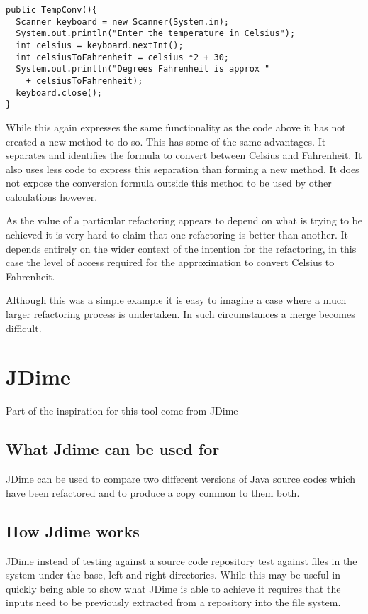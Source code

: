 \begin{lstlisting}
public TempConv(){
  Scanner keyboard = new Scanner(System.in);
  System.out.println("Enter the temperature in Celsius");
  int celsius = keyboard.nextInt();
  int celsiusToFahrenheit = celsius *2 + 30;
  System.out.println("Degrees Fahrenheit is approx " 
    + celsiusToFahrenheit);
  keyboard.close();
}
\end{lstlisting}

While this again expresses the same functionality as the code above it has not created a new method to do so. This has some of the same advantages. It separates and identifies the formula to convert between Celsius and Fahrenheit. It also uses less code to express this separation than forming a new method. It does not expose the conversion formula outside this method to be used by other calculations however.

As the value of a particular refactoring appears to depend on what is trying to be achieved it is very hard to claim that one refactoring is better than another. It depends entirely on the wider context of the intention for the refactoring, in this case the level of access required for the approximation to convert Celsius to Fahrenheit.

Although this was a simple example it is easy to imagine a case where a much larger refactoring process is undertaken. In such circumstances a merge becomes difficult. 

\section{JDime}
Part of the inspiration for this tool come from JDime

\subsection{What Jdime can be used for}
JDime can be used to compare two different versions of Java source codes which have been refactored and to produce a copy common to them both. 

\subsection{How Jdime works}
JDime instead of testing against a source code repository test against files in the system under the base, left and right directories.
While this may be useful in quickly being able to show what JDime is able to achieve it requires that the inputs need to be previously extracted from a repository into the file system.

